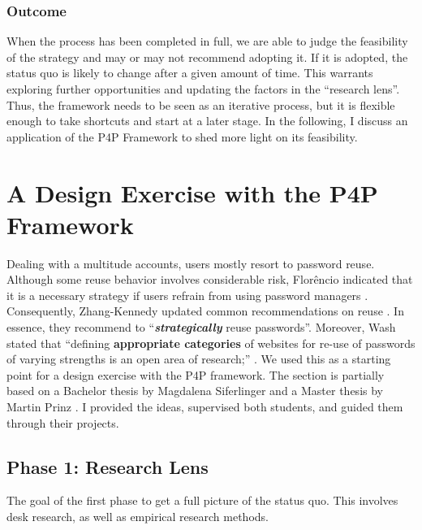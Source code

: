\subsubsection{Outcome}
When the process has been completed in full, we are able to judge the feasibility of the strategy and may or may not recommend adopting it. If it is adopted, the status quo is likely to change after a given amount of time. This warrants exploring further opportunities and updating the factors in the ``research lens''. Thus, the framework needs to be seen as an iterative process, but it is flexible enough to take shortcuts and start at a later stage. In the following, I discuss an application of the P4P Framework to shed more light on its feasibility. 


\section{A Design Exercise with the P4P Framework}
Dealing with a multitude accounts, users mostly resort to password reuse. Although some reuse behavior involves considerable risk, Florêncio \etal indicated that it is a necessary strategy if users refrain from using password managers \cite{Florencio2014PasswordPortfoliosFiniteUser}. Consequently, Zhang-Kennedy \etal updated common recommendations on reuse  \cite{ZhangKennedy2016RevisitingPasswordRules}. In essence, they recommend to ``\textit{\textbf{strategically}} reuse passwords''. Moreover, Wash \etal stated that ``defining \textbf{appropriate categories} of websites for re-use of passwords of varying strengths is an open area of research;'' \cite{Wash2016UnderstandingPasswordChoices}. We used this as a starting point for a design exercise with the P4P framework. The section is partially based on a Bachelor thesis by Magdalena Siferlinger \cite{Siferlinger2017BAThesis} and a Master thesis by Martin Prinz \cite{Prinz2017Thesis}. I provided the ideas, supervised both students, and guided them through their projects.

\subsection{Phase 1: Research Lens}
The goal of the first phase to get a full picture of the status quo. This involves desk research, as well as empirical research methods. 

